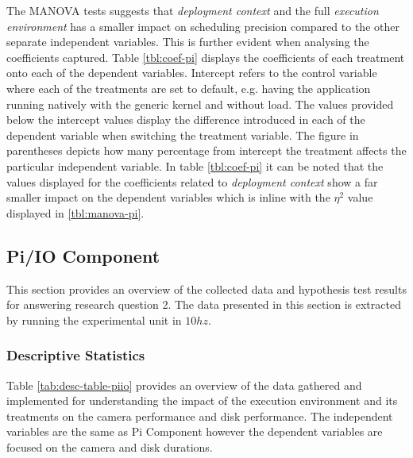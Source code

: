 The MANOVA tests suggests that \textit{deployment context} and the full \textit{execution environment} has a smaller impact on scheduling precision compared to the other separate independent variables. This is further evident when analysing the coefficients captured. Table \ref{tbl:coef-pi} displays the coefficients of each treatment onto each of the dependent variables. Intercept refers to the control variable where each of the treatments are set to default, e.g. having the application running natively with the generic kernel and without load. The values provided below the intercept values display the difference introduced in each of the dependent variable when switching the treatment variable. The figure in parentheses depicts how many percentage from intercept the treatment affects the particular independent variable. In table \ref{tbl:coef-pi} it can be noted that the values displayed for the coefficients related to \textit{deployment context} show a far smaller impact on the dependent variables which is inline with the $\eta^{2}$ value displayed in \ref{tbl:manova-pi}.




\subsection{Pi/IO Component}
\label{section:analysis-piiocomponent}

This section provides an overview of the collected data and hypothesis test results for answering research question 2. The data presented in this section is extracted by running the experimental unit in $10hz$.

\subsubsection{Descriptive Statistics}

Table \ref{tab:desc-table-piio} provides an overview of the data gathered and implemented for understanding the impact of the execution environment and its treatments on the camera performance and disk performance. The independent variables are the same as Pi Component however the dependent variables are focused on the camera and disk durations.


